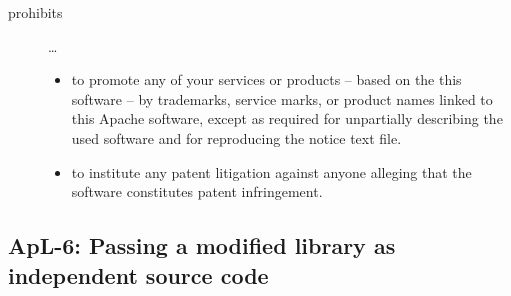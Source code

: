 \begin{description}
\begin{itemize}
\end{itemize}

\item[prohibits] \ldots
\begin{itemize}
  \item to promote any of your services or products – based on the this software
  – by trademarks, service marks, or product names linked to this Apache
  software, except as required for unpartially describing the used software and
  for reproducing the notice text file.
  \item to institute any patent litigation against anyone alleging that the
  software constitutes patent infringement.
\end{itemize}

\end{description}

\subsection{ApL-6: Passing a modified library as independent source code}
\label{OSUC-08-Apache20}

